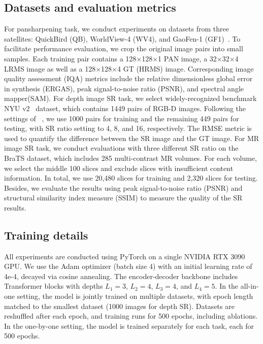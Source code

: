 \documentclass[lettersize,journal]{IEEEtran}
\begin{document}
\subsection{Datasets and evaluation metrics}
For pansharpening task, we conduct experiments on datasets from three satellites: QuickBird (QB), WorldView-4 (WV4), and GaoFen-1 (GF1)~\cite{pansharpening_dataset_meng2020large}. To facilitate performance evaluation, we crop the original image pairs into small samples. Each training pair contains a 128$\times$128$\times$1 PAN image, a 32$\times$32$\times$4 LRMS image as well as a 128$\times$128$\times$4 GT (HRMS) image.
Corresponding image quality assessment (IQA) metrics include the relative dimensionless global error in synthesis (ERGAS), peak signal-to-noise ratio (PSNR), and spectral angle mapper(SAM). 
For depth image SR task, we select widely-recognized benchmark NYU v2~\cite{depth_dataset_silberman2012indoor} dataset, which contains 1449 pairs of RGB-D images. Following the settings of ~\cite{depth_kim2021deformable}, we use 1000 pairs for training and the remaining 449 pairs for testing, with SR ratio setting to 4, 8, and 16, respectively.
The RMSE metric is used to quantify the difference between the SR image and the GT image.
For MR image SR task, we conduct evaluations with three different SR ratio on the BraTS dataset, which includes 285 multi-contrast MR volumes. For each volume, we select the middle 100 slices and exclude slices with insufficient content information. In total, we use 20,480 slices for training and 2,320 slices for testing. Besides, we evaluate the results using peak signal-to-noise ratio (PSNR) and structural similarity index measure (SSIM) to measure the quality of the SR results.

\subsection{Training details}
All experiments are conducted using PyTorch on a single NVIDIA RTX 3090 GPU. We use the Adam optimizer (batch size 4) with an initial learning rate of 4e-4, decayed via cosine annealing. The encoder-decoder backbone includes Transformer blocks with depths $L_1=3$, $L_2=4$, $L_3=4$, and $L_4=5$.
In the all-in-one setting, the model is jointly trained on multiple datasets, with epoch length matched to the smallest dataset (1000 images for depth SR). Datasets are reshuffled after each epoch, and training runs for 500 epochs, including ablations.
In the one-by-one setting, the model is trained separately for each task, each for 500 epochs.
\end{document}
